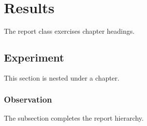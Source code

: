 \documentclass{report}
\begin{document}
\chapter{Results}
The report class exercises chapter headings.

\section{Experiment}
This section is nested under a chapter.

\subsection{Observation}
The subsection completes the report hierarchy.
\end{document}
